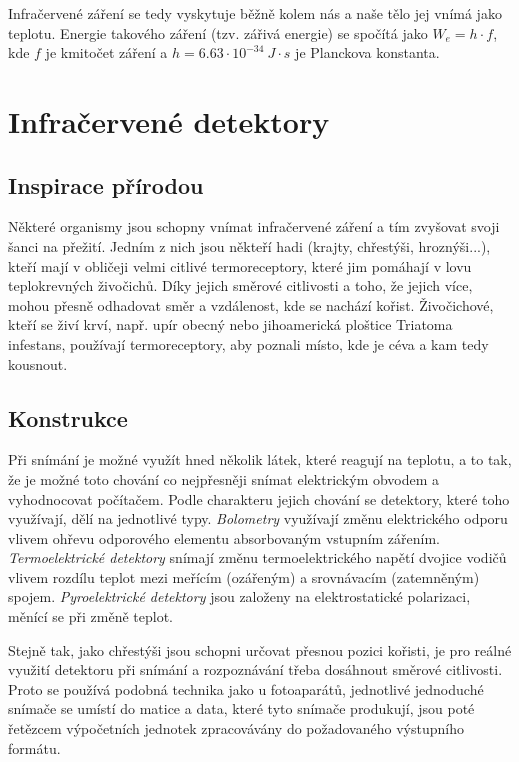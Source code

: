 \documentclass[10pt,a4paper,titlepage]{article}
\begin{document}
  Infračervené záření se tedy vyskytuje běžně kolem nás a naše tělo jej vnímá jako teplotu. Energie
  takového záření (tzv. zářivá energie) se spočítá jako $W_e=h\cdot f$, kde $f$ je kmitočet záření
  a $h=6.63\cdot10^{-34}~J\cdot s $ je Planckova konstanta. \cite{WikipediaInfrared}

  \section{Infračervené detektory}
  \subsection{Inspirace přírodou}
  Některé organismy jsou schopny vnímat infračervené záření a tím zvyšovat svoji šanci na přežití.
  Jedním z nich jsou někteří hadi (krajty, chřestýši, hroznýši...), kteří mají v obličeji velmi citlivé
  termoreceptory, které jim pomáhají v lovu teplokrevných živočichů. Díky jejich směrové citlivosti
  a toho, že jejich více, mohou přesně odhadovat směr a vzdálenost, kde se nachází kořist. \cite{SnakeInfrared}
  Živočichové, kteří se živí krví, např. upír obecný nebo jihoamerická ploštice Triatoma infestans,
  používají termoreceptory, aby poznali místo, kde je céva a kam tedy kousnout.

  \subsection{Konstrukce}
  Při snímání je možné využít hned několik látek, které reagují na teplotu, a to tak, že je možné
  toto chování co nejpřesněji snímat elektrickým obvodem a vyhodnocovat počítačem. Podle
  charakteru jejich chování se detektory, které toho využívají, dělí na jednotlivé typy.
  {\it Bolometry} využívají změnu elektrického odporu vlivem ohřevu odporového elementu
  absorbovaným vstupním zářením. {\it Termoelektrické detektory} snímají změnu termoelektrického
  napětí dvojice vodičů vlivem rozdílu teplot mezi meřícím (ozářeným) a srovnávacím (zatemněným)
  spojem. {\it Pyroelektrické detektory} jsou založeny na elektrostatické polarizaci, měnící se při
  změně teplot. \cite{DetectorsBook}

  Stejně tak, jako chřestýši jsou schopni určovat přesnou pozici kořisti, je pro reálné využití detektoru
  při snímání a rozpoznávání třeba dosáhnout směrové citlivosti. Proto se používá podobná technika jako
  u fotoaparátů, jednotlivé jednoduché snímače se umístí do matice a data, které tyto snímače produkují,
  jsou poté řetězcem výpočetních jednotek zpracovávány do požadovaného výstupního formátu.
  
\end{document}
